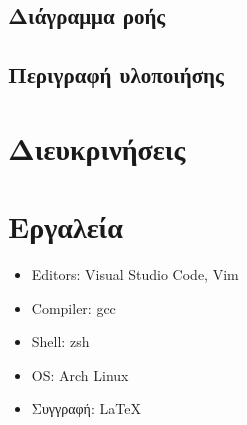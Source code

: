 \documentclass{article}
\begin{document}
    \subsection{Διάγραμμα ροής}

    \subsection{Περιγραφή υλοποιήσης}
    

\section{Διευκρινήσεις}



\section{Εργαλεία}

    \begin{itemize}
        \item Editors: Visual Studio Code, Vim
        \item Compiler: gcc
        \item Shell: zsh
        \item OS: Arch Linux
        \item Συγγραφή: \LaTeX
    \end{itemize}
\end{document}
